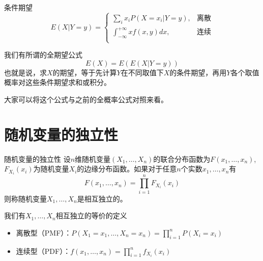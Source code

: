 
\begin{frame}

\begin{block}{条件期望}
$$E(X|Y=y) = \begin{cases}
\sum\limits_i x_i P(X=x_i | Y=y), & \text{离散} \\
\int_{-\infty}^{+\infty} x f(x,y) dx, & \text{连续} \\
\end{cases}$$

\vspace{1em}
\pause

我们有所谓的全期望公式
$$E(X) = E(E(X | Y=y))$$
也就是说，求$X$的期望，等于先计算$Y$在不同取值下$X$的条件期望，再用$Y$各个取值概率对这些条件期望求和或积分。

大家可以将这个公式与之前的全概率公式对照来看。
\end{block}

\end{frame}


\section{随机变量的独立性}


\begin{frame}

\begin{block}{随机变量的独立性}
设$n$维随机变量$(X_1,\ldots,X_n)$的联合分布函数为$F(x_1,\ldots,x_n)$, $F_{X_i}(x_i)$为随机变量$X_i$的边缘分布函数。如果对于任意$n$个实数$x_1,\ldots,x_n$有
$$F(x_1,\ldots,x_n) = \prod\limits_{i=1}^n F_{X_i}(x_i)$$
则称随机变量$X_1,\ldots,X_n$是相互独立的。

\vspace{2em}
\pause

我们有$X_1,\ldots,X_n$相互独立的等价的定义
\begin{itemize}
\item 离散型（PMF）：$P(X_1=x_1,\ldots,X_n=x_n) = \prod\limits_{i=1}^n P(X_i=x_i)$
\item 连续型（PDF）：$f(x_1,\ldots,x_n) = \prod\limits_{i=1}^n f_{X_i}(x_i)$
\end{itemize}
\end{block}

\end{frame}

